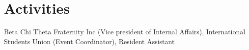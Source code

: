 \documentclass[]{two-column}
\begin{document}
\begin{minipage}[t]{0.66\textwidth}
\section{Activities}
Beta Chi Theta Fraternity Inc (Vice president of Internal Affairs), International Students Union (Event Coordinator), Resident Assistant

\end{minipage} 
\end{document}
